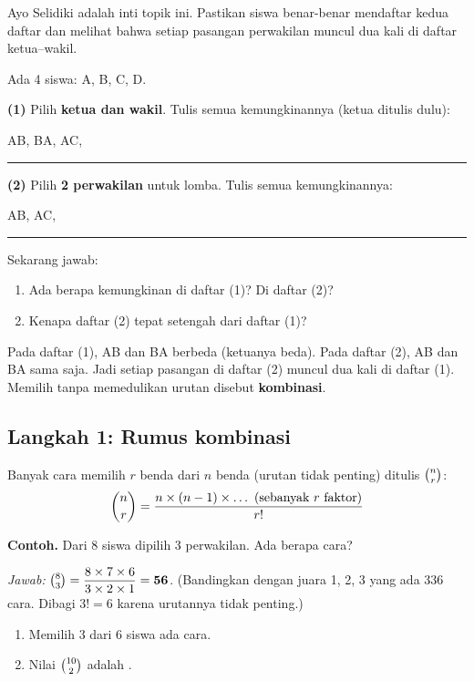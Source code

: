 \documentclass[11pt,a4paper]{article}
\begin{document}
\begin{catatanguru}
Ayo Selidiki adalah inti topik ini. Pastikan siswa benar-benar mendaftar kedua daftar dan melihat
bahwa setiap pasangan perwakilan muncul dua kali di daftar ketua--wakil.
\end{catatanguru}

\begin{selidiki}
Ada 4 siswa: A, B, C, D.

\textbf{(1)} Pilih \textbf{ketua dan wakil}. Tulis semua kemungkinannya (ketua ditulis dulu):

AB, BA, AC, \rule{7cm}{0.4pt}

\textbf{(2)} Pilih \textbf{2 perwakilan} untuk lomba. Tulis semua kemungkinannya:

AB, AC, \rule{7cm}{0.4pt}

Sekarang jawab:
\begin{enumerate}
    \item Ada berapa kemungkinan di daftar (1)? Di daftar (2)?
    \item Kenapa daftar (2) tepat setengah dari daftar (1)?
\end{enumerate}

Pada daftar (1), AB dan BA berbeda (ketuanya beda). Pada daftar (2), AB dan BA sama saja.
Jadi setiap pasangan di daftar (2) muncul dua kali di daftar (1). Memilih tanpa memedulikan
urutan disebut \textbf{kombinasi}.
\end{selidiki}

\subsection*{Langkah 1: Rumus kombinasi}
Banyak cara memilih $r$ benda dari $n$ benda (urutan tidak penting) ditulis $\binom{n}{r}$:
\[ \binom{n}{r} = \frac{n \times (n-1) \times \dots \text{ (sebanyak $r$ faktor)}}{r!} \]

\begin{contoh}
\textbf{Contoh.} Dari 8 siswa dipilih 3 perwakilan. Ada berapa cara?

\textit{Jawab:} $\binom{8}{3} = \dfrac{8 \times 7 \times 6}{3 \times 2 \times 1} = \textbf{56}$.
(Bandingkan dengan juara 1, 2, 3 yang ada 336 cara. Dibagi $3! = 6$ karena urutannya tidak penting.)
\end{contoh}

\begin{giliranmu}
\begin{enumerate}[label=\alph*.]
    \item Memilih 3 dari 6 siswa ada \kosong{} cara.
    \item Nilai $\binom{10}{2}$ adalah \kosong.
\end{enumerate}
\end{giliranmu}
\end{document}
